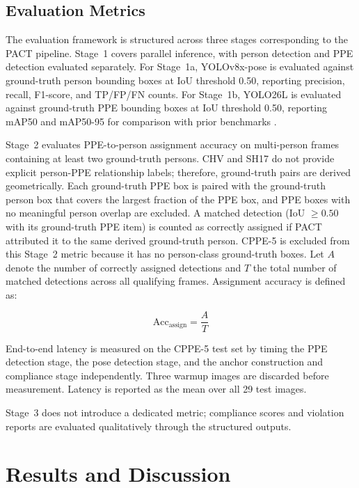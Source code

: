 \documentclass[conference]{IEEEtran}
\begin{document}
\subsection{Evaluation Metrics}
The evaluation framework is structured across three stages corresponding to the PACT pipeline. Stage~1 covers parallel inference, with person detection and PPE detection evaluated separately. For Stage~1a, YOLOv8x-pose is evaluated against ground-truth person bounding boxes at IoU threshold 0.50, reporting precision, recall, F1-score, and TP/FP/FN counts. For Stage~1b, YOLO26L is evaluated against ground-truth PPE bounding boxes at IoU threshold 0.50, reporting mAP50 and mAP50-95 for comparison with prior benchmarks \cite{ref5,ref1,ref2}.

Stage~2 evaluates PPE-to-person assignment accuracy on multi-person frames containing at least two ground-truth persons. CHV and SH17 do not provide explicit person-PPE relationship labels; therefore, ground-truth pairs are derived geometrically. Each ground-truth PPE box is paired with the ground-truth person box that covers the largest fraction of the PPE box, and PPE boxes with no meaningful person overlap are excluded. A matched detection (IoU $\geq 0.50$ with its ground-truth PPE item) is counted as correctly assigned if PACT attributed it to the same derived ground-truth person. CPPE-5 is excluded from this Stage~2 metric because it has no person-class ground-truth boxes. Let $A$ denote the number of correctly assigned detections and $T$ the total number of matched detections across all qualifying frames. Assignment accuracy is defined as:

\begin{equation}
    \text{Acc}_{\text{assign}} = \frac{A}{T}
    \label{eq:assign_acc}
\end{equation}

End-to-end latency is measured on the CPPE-5 test set by timing the PPE detection stage, the pose detection stage, and the anchor construction and compliance stage independently. Three warmup images are discarded before measurement. Latency is reported as the mean over all 29 test images.

Stage~3 does not introduce a dedicated metric; compliance scores and violation reports are evaluated qualitatively through the structured outputs.

\FloatBarrier


\section{Results and Discussion}
\FloatBarrier
\end{document}
